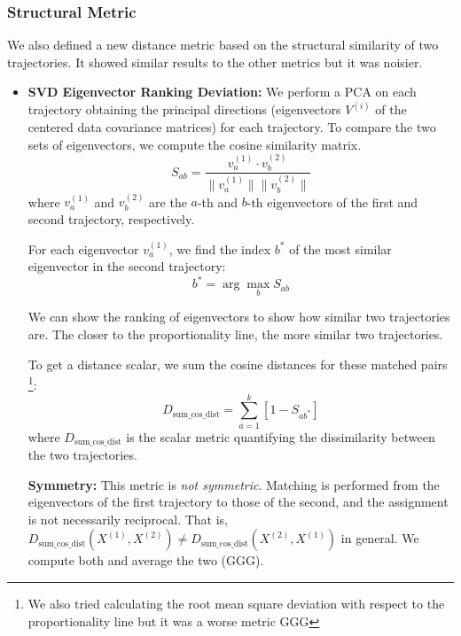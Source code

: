 \documentclass[a4paper,12pt]{article}
\begin{document}
\subsubsection{Structural Metric} %
We also defined a new distance metric based on the structural similarity of two trajectories. It showed similar results to the other metrics but it was noisier.
\begin{itemize}
        
    \item \textbf{SVD Eigenvector Ranking Deviation:} We perform a PCA on each trajectory obtaining the principal directions (eigenvectors $V^{(i)}$ of the centered data covariance matrices) for each trajectory. To compare the two sets of eigenvectors, we compute the cosine similarity matrix.
    \[
    S_{ab} = \frac{v^{(1)}_a \cdot v^{(2)}_b}{\|v^{(1)}_a\| \|v^{(2)}_b\|}
    \]
    where $v^{(1)}_a$ and $v^{(2)}_b$ are the $a$-th and $b$-th eigenvectors of the first and second trajectory, respectively.

    For each eigenvector $v^{(1)}_a$, we find the index $b^*$ of the most similar eigenvector in the second trajectory:
    \[
    b^* = \arg\max_b S_{ab}
    \]

    We can show the ranking of eigenvectors to show how similar two trajectories are. The closer to the proportionality line, the more similar two trajectories.

    To get a distance scalar, we sum the cosine distances for these matched pairs \footnote{We also tried calculating the root mean square deviation with respect to the proportionality line but it was a worse metric GGG}:
    \[
    D_{\text{sum\_cos\_dist}} = \sum_{a=1}^k \left[1 - S_{a b^*}\right]
    \]
    where $D_{\text{sum\_cos\_dist}}$ is the scalar metric quantifying the dissimilarity between the two trajectories.

    \textbf{Symmetry:} This metric is \emph{not symmetric}. Matching is performed from the eigenvectors of the first trajectory to those of the second, and the assignment is not necessarily reciprocal. That is, $D_{\text{sum\_cos\_dist}}(X^{(1)}, X^{(2)}) \neq D_{\text{sum\_cos\_dist}}(X^{(2)}, X^{(1)})$ in general. We compute both and average the two (GGG).

\end{itemize}
\end{document}
